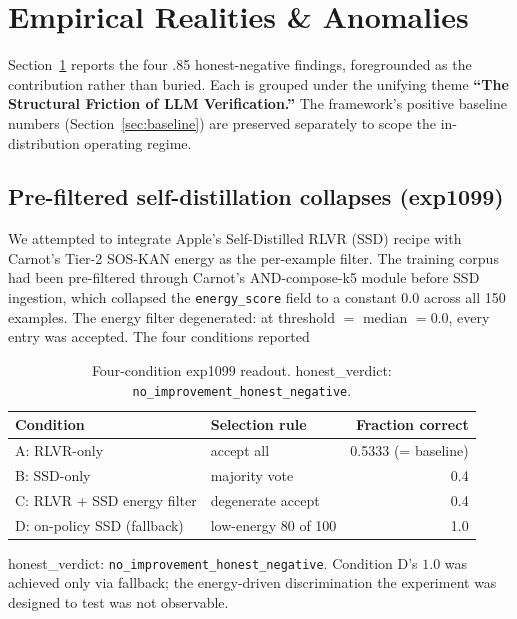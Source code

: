 \documentclass[10pt]{article}
\begin{document}
\section{Empirical Realities \& Anomalies}
\label{sec:empirical}

Section~\ref{sec:empirical} reports the four .85 honest-negative
findings, foregrounded as the contribution rather than buried.
Each is grouped under the unifying theme \textbf{``The Structural
Friction of LLM Verification.''} The framework's positive baseline
numbers (Section~\ref{sec:baseline}) are preserved separately to
scope the in-distribution operating regime.

\subsection{Pre-filtered self-distillation collapses (exp1099)}

We attempted to integrate Apple's Self-Distilled RLVR (SSD) recipe
with Carnot's Tier-2 SOS-KAN energy as the per-example filter. The
training corpus had been pre-filtered through Carnot's
AND-compose-k5 module before SSD ingestion, which collapsed the
\texttt{energy\_score} field to a constant $0.0$ across all 150
examples. The energy filter degenerated: at threshold
$=$ median $= 0.0$, every entry was accepted. The four conditions
reported

\begin{table}[ht]
  \centering
  \begin{tabular}{llr}
    \toprule
    Condition & Selection rule & Fraction correct \\
    \midrule
    A: RLVR-only & accept all & 0.5333 (= baseline) \\
    B: SSD-only & majority vote & 0.4 \\
    C: RLVR + SSD energy filter & degenerate accept & 0.4 \\
    D: on-policy SSD (fallback) & low-energy 80 of 100 & 1.0 \\
    \bottomrule
  \end{tabular}
  \caption{Four-condition exp1099 readout. honest\_verdict:
  \texttt{no\_improvement\_honest\_negative}.}
  \label{tab:exp1099}
\end{table}

honest\_verdict: \texttt{no\_improvement\_honest\_negative}.
Condition D's $1.0$ was achieved only via fallback; the
energy-driven discrimination the experiment was designed to test
was not observable.
\end{document}
